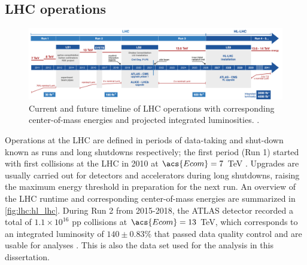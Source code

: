 \documentclass[../thesis.tex]{subfiles}
\begin{document}
\subsection{LHC operations}

\begin{figure}[!htb]
\begin{center}
\includegraphics[width=\linewidth]{fig/lhc_hl_lhc.png}
\caption[Current and future timeline of LHC operations as of 2025 with corresponding center-of-mass energies and projected integrated luminosities.]{\label{fig:lhc:hl_lhc}Current and future timeline of \acs{LHC} operations with corresponding center-of-mass energies and projected integrated luminosities. \citep{lhc:hl_lhc}.}
\end{center}
\end{figure}

Operations at the \acs{LHC} are defined in periods of data-taking and shut-down known as runs and long shutdowns respectively; the first period (Run 1) started with first collisions at the \acs{LHC} in 2010 at $\acs{Ecom}=7$ TeV \citep{PERF-2010-01}. Upgrades are usually carried out for detectors and accelerators during long shutdowns, raising the maximum energy threshold in preparation for the next run. An overview of the \acs{LHC} runtime and corresponding center-of-mass energies are summarized in \autoref{fig:lhc:hl_lhc}. During Run 2 from 2015-2018, the \acs{ATLAS} detector recorded a total of $1.1\times 10^{16}$ \acs{pp} collisions at $\acs{Ecom}=13$ TeV, which corresponds to an integrated luminosity of $140 \pm 0.83\%$ \fb that passed data quality control and are usable for analyses \citep{DAPR-2021-01}. This is also the data set used for the analysis in this dissertation.

\end{document}
